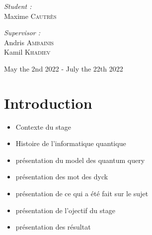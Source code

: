 \documentclass[11pt,a4paper]{article}
\theoremstyle{definition}
\theoremstyle{plain}
\theoremstyle{definition}
\begin{document}
\begin{titlepage}
\begin{sffamily}
\begin{center}
            \hspace{-0.8cm}
            \begin{minipage}{0.4\textwidth}
                \begin{flushleft} \large
                    \emph{Student :} \\
                    Maxime \textsc{Cautrès}\\
                \end{flushleft}
            \end{minipage}
            \hspace{3cm}
            \begin{minipage}{0.4\textwidth}
                \begin{flushright} \large
                    \emph{Supervisor :} \\
                    Andris \textsc{Ambainis}\\
                    Kamil \textsc{Khadiev}\\
                \end{flushright}
            \end{minipage}

            \vspace*{0.5cm}
            {\large   May the 2nd 2022 -  July the 22th 2022}
        \end{center}
    \end{sffamily}
\end{titlepage}

\tableofcontents

\newpage




\section{Introduction}

 {\color{red}
  \begin{itemize}
      \item Contexte du stage
      \item Histoire de l'informatique quantique
      \item présentation du model des quantum query
      \item présentation des mot des dyck
      \item présentation de ce qui a été fait sur le sujet
      \item présentation de l'ojectif du stage
      \item présentation des résultat
  \end{itemize}}
\end{document}
